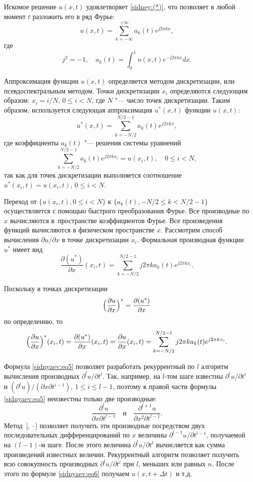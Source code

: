 Искомое решение $u(x,t)$ удовлетворяет \eqref{sidney:(*)}, что позволяет в любой момент $t$
разложить  его в ряд Фурье:
$$
u (x,t)=\sum\limits_{k=-\infty }^{+\infty } a_k (t)e^{j 2 \pi k x},
$$
где 
$$j^2=-1,\quad  a_k ( t )=\int_0^1 u (x,t)e^{-j 2 \pi k x}dx.$$

Аппроксимация функции $u (x,t)$ определяется методом
дискретизации, или псевдоспектральным методом. Точки дискретизации $x_i$
определяются следующим образом: $x_i =i/N$, $0\le i<N$, где $N$ "--- число точек дискретизации. Таким образом, используется следующая
аппроксимация $u^\ast (x,t)$ функции $u (x,t)$:
\begin{equation}
\label{sidnyaev:eq7}
u^\ast (x,t)=\sum\limits_{k=-N/2}^{N/2-1} a_k ( t )e^{j2\pi k x},
\end{equation}
где коэффициенты $a_k ( t )$ "--- решения системы уравнений
$$
\sum\limits_{k=-N/2}^{N /2-1} a_k (t)e^{j 2\pi k x_i} =u (x_i ,t ),\quad 0\le i<N,
$$
так как для точек дискретизации выполняется соотношение $u^\ast (x_i,t)=u ( x_i,t )$, $0\le i<N$.

Переход от $ \{ u (x_i, t), 0\le i<N \}$ к
$ \{ a_k ( t ), - N/2 \le k< N / 2-1 \}$ осуществляется с помощью быстрого преобразования Фурье. 
Все производные по $x$ вычисляются в~пространстве коэффициентов Фурье. 
Все произведения функций вычисляются в физическом пространстве $x$.
Рассмотрим способ вычисления $ {\partial u}/{\partial x}$ в точке дискретизации $x_i$. 
Формальная производная функции $u^\ast$ имеет вид
\[
\frac{\partial (u^\ast)}{\partial x} (x_i,t)=\sum\limits_{k=-N/2}^{N / 2-1}
j 2 \pi k a_k ( t ) e^{j 2 \pi k x_i}.
\]

Поскольку в точках дискретизации
$$
\Bigl( \frac{\partial u}{\partial x} \Bigr)^\ast =\frac{\partial (u^\ast)} {\partial x}
$$
по определению, то
\[
\Bigl( \frac{\partial u}{\partial x} \Bigr)^\ast (x_i,t)=\frac{\partial (u^\ast)}{\partial x}(x_i,t)=
\frac{\partial u}{\partial x}(x_i,t)=\sum\limits_{k=-N/2}^{N/2-1}
j2\pi k a_k ( t )e^{j 2 \pi k x_i}.
\]

Формула \eqref{sidnyaev:eq5} позволяет разработать рекуррентный по $l$ алгоритм вычисления
производных ${\partial ^lu} / {\partial t^l}$. 
Так, например, на $l$-том шаге известны ${\partial ^iu}/{\partial t^i}$ %
и $({\partial ^iu})/({\partial x\partial t^{i-1}})$, $1\le i\le l-1$, 
поэтому в правой части формулы \eqref{sidnyaev:eq5} неизвестны только две производные: 
$$
\frac{\partial ^lu}{\partial x\partial t^{l-1}} \quad \text{и} \quad
\frac{\partial ^{l+1}u}{\partial x^2\partial t^{l-1}}.
$$
Метод~[, --] позволяет получить эти производные посредством двух
последовательных дифференцирований по $x$ величины ${\partial^{l-1}u}/{\partial t^{l-1}}$, получаемой на $(l-1)$-м
шаге. После этого величина ${\partial^lu}/{\partial t^l}$
вычисляется как сумма произведений известных величин. Рекуррентный алгоритм
позволяет получить всю совокупность производных ${\partial ^lu}/{\partial t^l}$ при $l$, меньших или равных $n$. После этого по формуле
\eqref{sidnyaev:eq6} получаем $u(x,t+\Delta t)$ и т.д.

